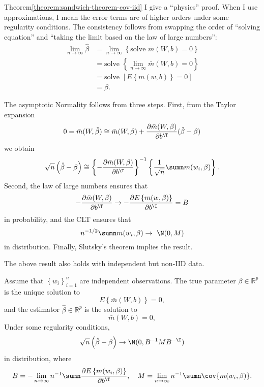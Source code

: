 \begin{myproof}{Theorem}{\ref{theorem:sandwich-theorem-cov-iid}}
I give a ``physics'' proof.  When I use approximations, I mean the
error terms are of higher orders under some regularity conditions. The
consistency follows from swapping the order of ``solving equation''
and ``taking the limit based on the law of large numbers'':
\begin{align*}
\lim_{n\rightarrow\infty}\hat{\beta} & =\lim_{n\rightarrow\infty}\left\{ \text{solve } \bar{m}(W,b)=0\right\} \\
 & =\text{solve } \left\{ \lim_{n\rightarrow\infty} \bar{m}(W,b) =0 \right\} \\
 & =\text{solve } \left[ E\left\{ m(w,b)\right\} =0 \right] \\
 &=\beta.
\end{align*}

The asymptotic Normality follows from three steps. First, from the Taylor expansion
$$
0  = \bar{m}(W,\hat{\beta}) \cong \bar{m}(W,\beta)
+ \frac{\partial \bar{m}(W,\beta)}{\partial b^{\T}} (\hat{\beta}-\beta)
$$
we obtain 
$$
 \sqrt{n}\left(\hat{\beta}-\beta\right) \cong  \left\{  -   \frac{\partial \bar{m}(W,\beta)}{\partial b^{\T}} \right\} ^{-1}\left\{ \frac{1}{\text{\ensuremath{\sqrt{n}}}}\sumn m(w_{i},\beta)\right\} .
$$
Second, the law of large numbers ensures that 
\[
- \frac{\partial \bar{m}(W,\beta)}{\partial b^{\T}}  
\rightarrow - \frac{\partial E\left\{ m(w,\beta) \right\} }{\partial b^{\T}} =B
\]
in probability, and the CLT ensures that
$$
n^{-1/2}\sumn m(w_{i},\beta)\rightarrow\ \N(0,M)
$$
in distribution. 
Finally, Slutsky's theorem implies the result. 
\end{myproof}


The above result also holds with independent but non-IID data. 


\begin{theorem}
\label{theorem:sandwich-theorem-cov-ind}Assume that $\left\{ w_{i}\right\} _{i=1}^{n}$ are independent observations.
The true parameter $\beta\in\mathbb{R}^{p}$ is the unique solution to  
\[
E\left\{\bar{m}(W,b)\right\} =0,
\]
 and the estimator $\hat{\beta}\in\mathbb{R}^{p}$ is the solution to
\[
\bar{m}(W,b)  =0,
\]
Under some regularity conditions, 
\[
\sqrt{n}\left(\hat{\beta}-\beta\right)\rightarrow\N(0,B^{-1}MB^{-\T})
\]
in distribution, where 
$$
B  = - \lim_{n\rightarrow \infty } n^{-1} \sumn  
 \frac{\partial E\left\{ m(w_i,\beta) \right\} }{\partial b^{\T}} ,\quad 
M =   \lim_{n\rightarrow \infty } n^{-1} \sumn \cov\{ m(w_{i},\beta) \}  .
$$
\end{theorem}


